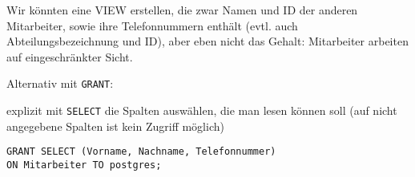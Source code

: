 \documentclass{bschlangaul-aufgabe}
\begin{document}
\begin{enumerate}
\begin{liAntwort}
Wir könnten eine VIEW erstellen, die zwar Namen und ID der anderen
Mitarbeiter, sowie ihre Telefonnummern enthält (evtl. auch
Abteilungsbezeichnung und ID), aber eben nicht das Gehalt: Mitarbeiter
arbeiten auf eingeschränkter Sicht.

Alternativ mit \verb|GRANT|:

explizit mit \verb|SELECT| die Spalten auswählen,
die man lesen können soll (auf nicht angegebene Spalten ist kein Zugriff
möglich)

\begin{verbatim}
GRANT SELECT (Vorname, Nachname, Telefonnummer)
ON Mitarbeiter TO postgres;
\end{verbatim}
\end{liAntwort}
\end{enumerate}
\end{document}
